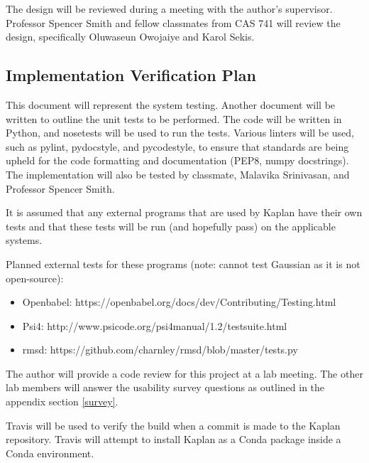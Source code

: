 \documentclass[12pt, titlepage]{article}
\newcommand{\progname}{Kaplan} %
\begin{document}
The design will be reviewed during a meeting with the author's supervisor. 
Professor Spencer Smith and fellow classmates from CAS 741 will review the
design, specifically Oluwaseun Owojaiye and Karol Sekis.

\subsection{Implementation Verification Plan}

This document will represent the system testing. Another document will be
written to outline the unit tests to be performed.  The code will be
written in Python, and nosetests  will be used to run the tests. Various linters will be used, such
as pylint, pydocstyle, and pycodestyle, to ensure that standards are being
upheld for the code formatting and documentation (PEP8, numpy
docstrings).  The implementation will also be
tested by classmate, Malavika Srinivasan, and Professor Spencer Smith.


It is assumed that any external programs that are used by \progname{} have 
their own tests and that these tests will be run (and hopefully pass) on the 
applicable systems.

Planned external tests for these programs (note: cannot test Gaussian as it is 
not open-source):

\begin{itemize}
	\item Openbabel: https://openbabel.org/docs/dev/Contributing/Testing.html
	\item Psi4: http://www.psicode.org/psi4manual/1.2/testsuite.html
	\item rmsd: https://github.com/charnley/rmsd/blob/master/tests.py
\end{itemize}

The author will provide a code review for this project at a lab meeting. The 
other lab members will answer the usability survey questions as outlined in the 
appendix section \ref{survey}.
				
Travis will be used to verify the build when a commit is made to the 
\progname{} repository. Travis will attempt to install \progname{} as a Conda 
package inside a Conda environment. 
\end{document}
